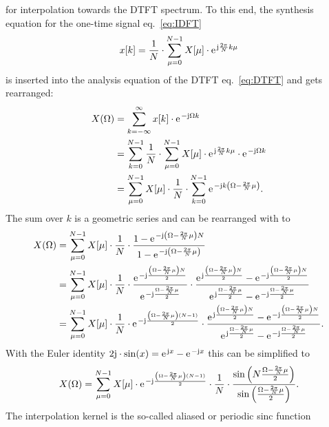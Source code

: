 \documentclass[11pt,a4paper,DIV=12]{scrartcl}
\begin{document}
for interpolation towards the DTFT spectrum.
%
To this end, the synthesis equation for the one-time signal eq.~\eqref{eq:IDFT}
%
\begin{equation}
x[k]=\frac{1}{N}\cdot\sum_{\mu=0}^{N-1}X[\mu]\cdot\e^{\im\frac{2\pi}{N}k\mu}
\end{equation}
%
is inserted into the analysis equation of the DTFT eq.~\eqref{eq:DTFT} and gets
rearranged:
\begin{align}
X(\Omega)&=\sum_{k=-\infty}^\infty x[k]\cdot\e^{-\im\Omega k}\\
&=\sum_{k=0}^{N-1}\frac{1}{N}\cdot\sum_{\mu=0}^{N-1}X[\mu]\cdot\e^{\im\frac{2\pi}{N}k\mu}\cdot\e^{-\im\Omega k}\\
&=\sum_{\mu=0}^{N-1}X[\mu]\cdot\frac{1}{N}\cdot\sum_{k=0}^{N-1}\e^{-\im k\left(\Omega-\frac{2\pi}{N}\mu\right)}.
\end{align}
%
The sum over $k$ is a geometric series and can be rearranged with
\cite[(3-39)]{Lyons2011} to
%
\begin{align}
X(\Omega)&=\sum_{\mu=0}^{N-1}X[\mu]\cdot\frac{1}{N}\cdot\frac{1-\e^{-\im\left(\Omega-\frac{2\pi}{N}\mu\right)N}}{1-\e^{-\im\left(\Omega-\frac{2\pi}{N}\mu\right)}}\\
&=\sum_{\mu=0}^{N-1}X[\mu]\cdot\frac{1}{N}\cdot\frac{\e^{-\im\frac{\left(\Omega-\frac{2\pi}{N}\mu\right)N}{2}}}{\e^{-\im\frac{\Omega-\frac{2\pi}{N}\mu}{2}}}\cdot\frac{\e^{\im\frac{\left(\Omega-\frac{2\pi}{N}\mu\right)N}{2}}-\e^{-\im\frac{\left(\Omega-\frac{2\pi}{N}\mu\right)N}{2}}}{\e^{\im\frac{\Omega-\frac{2\pi}{N}\mu}{2}}-\e^{-\im\frac{\Omega-\frac{2\pi}{N}\mu}{2}}}\\
&=\sum_{\mu=0}^{N-1}X[\mu]\cdot\frac{1}{N}\cdot\e^{-\im\frac{\left(\Omega-\frac{2\pi}{N}\mu\right)(N-1)}{2}}\cdot\frac{\e^{\im\frac{\left(\Omega-\frac{2\pi}{N}\mu\right)N}{2}}-\e^{-\im\frac{\left(\Omega-\frac{2\pi}{N}\mu\right)N}{2}}}{\e^{\im\frac{\Omega-\frac{2\pi}{N}\mu}{2}}-\e^{-\im\frac{\Omega-\frac{2\pi}{N}\mu}{2}}}.
\end{align}
%
With the Euler identity $2\im\cdot\sin(x)=\e^{\im x}-\e^{-\im x}$ this can be
simplified to \cite[eq.~(2.41)]{Moeser2011}
%
\begin{equation}
X(\Omega)=\sum_{\mu=0}^{N-1}X[\mu]\cdot\e^{-\im\frac{\left(\Omega-\frac{2\pi}{N}\mu\right)(N-1)}{2}}\cdot\frac{1}{N}\cdot\frac{\sin\left(N\frac{\Omega-\frac{2\pi}{N}\mu}{2}\right)}{\sin\left(\frac{\Omega-\frac{2\pi}{N}\mu}{2}\right)}.
\label{eq:DTFT_Interpolation}
\end{equation}
%
The interpolation kernel is the so-called aliased or periodic sinc function
\end{document}
